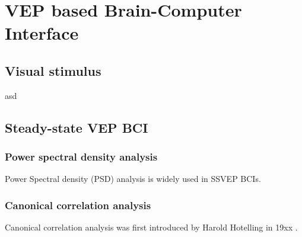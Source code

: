 
\chapter{VEP based Brain-Computer Interface}
\section{Visual stimulus}
asd
\section{Steady-state VEP BCI}
\label{SSVEP_detection}
\subsection{Power spectral density analysis}
Power Spectral density (PSD) analysis is widely used in SSVEP BCIs\cite{bin2009cca}.
\subsection{Canonical correlation analysis}
Canonical correlation analysis was first introduced by Harold Hotelling in 19xx .